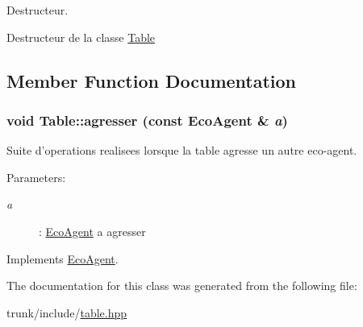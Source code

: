 Destructeur. 

Destructeur de la classe \hyperlink{classTable}{Table} 

\subsection{Member Function Documentation}
\hypertarget{classTable_1aac4abcbb55e193e23a2e547c232273}{
\subsubsection[{agresser}]{\setlength{\rightskip}{0pt plus 5cm}void Table::agresser (const {\bf EcoAgent} \& {\em a})}}
\label{classTable_1aac4abcbb55e193e23a2e547c232273}


Suite d'operations realisees lorsque la table agresse un autre eco-agent. 

\begin{Desc}
\item[Parameters:]
\begin{description}
\item[{\em a}]: \hyperlink{classEcoAgent}{EcoAgent} a agresser \end{description}
\end{Desc}


Implements \hyperlink{classEcoAgent_5d7e837b4a3a6b73fc1fb60c5fddefa5}{EcoAgent}.

The documentation for this class was generated from the following file:\begin{CompactItemize}
\item 
trunk/include/\hyperlink{table_8hpp}{table.hpp}\end{CompactItemize}
